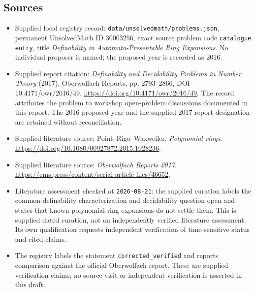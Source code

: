\documentclass[11pt]{article}
\begin{document}
\subsection{Sources}
\begin{itemize}
\item Supplied local registry record: \texttt{data/unsolvedmath/problems.json}, permanent UnsolvedMath ID \(30003256\), exact source problem code \texttt{catalogue entry}, title \emph{Definability in Automata-Presentable Ring Expansions}. No individual proposer is named; the proposed year is recorded as 2016.
\item Supplied report citation: \emph{Definability and Decidability Problems in Number Theory} (2017), Oberwolfach Reports, pp. 2793--2866, DOI 10.4171/owr/2016/49. \url{https://doi.org/10.4171/owr/2016/49}. The record attributes the problem to workshop open-problem discussions documented in this report. The 2016 proposed year and the supplied 2017 report designation are retained without reconciliation.
\item Supplied literature source: Point--Rigo--Waxweiler, \emph{Polynomial rings}. \url{https://doi.org/10.1080/00927872.2015.1028236}.
\item Supplied literature source: \emph{Oberwolfach Reports 2017}. \url{https://ems.press/content/serial-article-files/46652}.
\item Literature assessment checked at \texttt{2026-08-21}: the supplied curation labels the common-definability characterization and decidability question open and states that known polynomial-ring expansions do not settle them. This is supplied dated curation, not an independently verified literature assessment. Its own qualification requests independent verification of time-sensitive status and cited claims.
\item The registry labels the statement \texttt{corrected\_verified} and reports comparison against the official Oberwolfach report. These are supplied verification claims; no source visit or independent verification is asserted in this draft.
\end{itemize}
\end{document}
